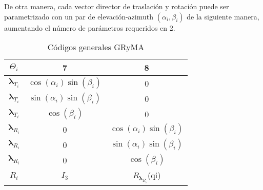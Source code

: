         De otra manera, cada vector director de traslación y rotación puede ser parametrizado 
        con un par de elevación-azimuth $(\alpha_i,\beta_i)$ de la siguiente manera, 
        aumentando el número de parámetros requeridos en 2. 
        \begin{table}[H]
            \caption{Códigos generales GRyMA}
            \label{tb:generales_gryma}
            \centering
            \begin{center}
                \begin{tabular}{ccc}
                    $\Theta_i$ & 7 & 8\\
                    \hline \hline 
                    $\boldsymbol{\lambda}_{T_i}$ & $\cos{(\alpha_i)}\sin{(\beta_i)}$ & 0\\ 
                    $\boldsymbol{\lambda}_{T_i}$ & $\sin{(\alpha_i)}\sin{(\beta_i)}$ & 0\\
                    $\boldsymbol{\lambda}_{T_i}$ & $\cos{(\beta_i)}$ & 0\\
                    \hline 
                    $\boldsymbol{\lambda}_{R_i}$ & 0 & $\cos{(\alpha_i)}\sin{(\beta_i)}$\\
                    $\boldsymbol{\lambda}_{R_i}$ & 0 & $\sin{(\alpha_i)}\sin{(\beta_i)}$\\
                    $\boldsymbol{\lambda}_{R_i}$ & 0 & $\cos{(\beta_i)}$\\
                    \hline 
                    $R_{i}$ & $I_3$ & $R_{\boldsymbol{\lambda}_{R_i}}$(qi)\\ 
                \end{tabular}
            \end{center}
        \end{table}

